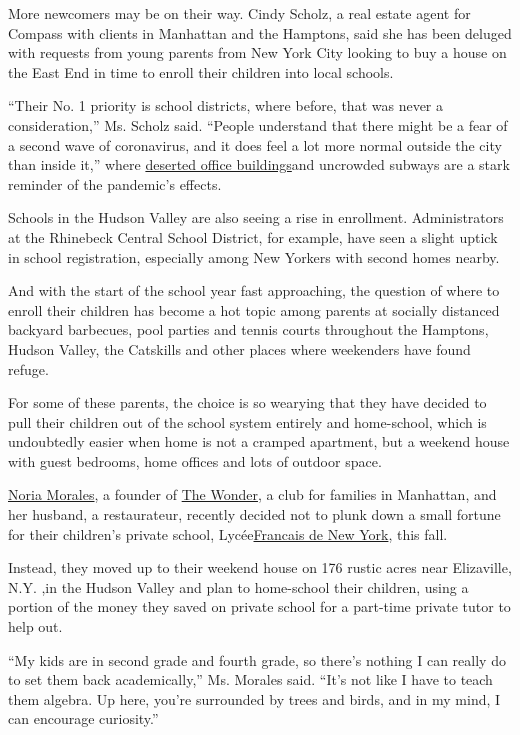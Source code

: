 More newcomers may be on their way. Cindy Scholz, a real estate agent
for Compass with clients in Manhattan and the Hamptons, said she has
been deluged with requests from young parents from New York City looking
to buy a house on the East End in time to enroll their children into
local schools.

``Their No. 1 priority is school districts, where before, that was never
a consideration,'' Ms. Scholz said. ``People understand that there might
be a fear of a second wave of coronavirus, and it does feel a lot more
normal outside the city than inside it,'' where
\href{https://www.nytimes.com/2020/07/26/nyregion/nyc-coronavirus-time-life-building.html}{deserted
office buildings}and uncrowded subways are a stark reminder of the
pandemic's effects.

Schools in the Hudson Valley are also seeing a rise in enrollment.
Administrators at the Rhinebeck Central School District, for example,
have seen a slight uptick in school registration, especially among New
Yorkers with second homes nearby.

And with the start of the school year fast approaching, the question of
where to enroll their children has become a hot topic among parents at
socially distanced backyard barbecues, pool parties and tennis courts
throughout the Hamptons, Hudson Valley, the Catskills and other places
where weekenders have found refuge.

For some of these parents, the choice is so wearying that they have
decided to pull their children out of the school system entirely and
home-school, which is undoubtedly easier when home is not a cramped
apartment, but a weekend house with guest bedrooms, home offices and
lots of outdoor space.

\href{https://www.glamour.com/story/noria-morales-what-it-costs-to-be-me}{Noria
Morales}, a founder of \href{https://www.thewonder.us/}{The Wonder}, a
club for families in Manhattan, and her husband, a restaurateur,
recently decided not to plunk down a small fortune for their children's
private school, Lycée\href{https://www.lfny.org/}{Francais de New York},
this fall.

Instead, they moved up to their weekend house on 176 rustic acres near
Elizaville, N.Y. ,in the Hudson Valley and plan to home-school their
children, using a portion of the money they saved on private school for
a part-time private tutor to help out.

``My kids are in second grade and fourth grade, so there's nothing I can
really do to set them back academically,'' Ms. Morales said. ``It's not
like I have to teach them algebra. Up here, you're surrounded by trees
and birds, and in my mind, I can encourage curiosity.''

